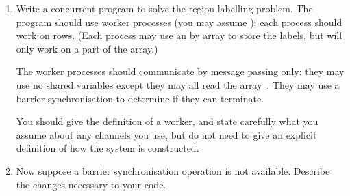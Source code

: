 \begin{question}

\begin{enumerate}
\item
Write a concurrent program to solve the region labelling problem.  The program
should use  worker processes (you may assume ); each
process should work on  rows.  (Each process may use an
 by  array to store the labels, but will only work on a part
of the array.)  

The worker processes should communicate by message passing only: they may use
no shared variables except they may all read the array~.  They may
use a barrier synchronisation to determine if they can terminate.

You should give the definition of a worker, and state carefully what you
assume about any channels you use, but do not need to give an explicit
definition of how the system is constructed. 


\item
Now suppose a barrier synchronisation operation is not available.  Describe
the changes necessary to your code.
\end{enumerate}
\end{question}


